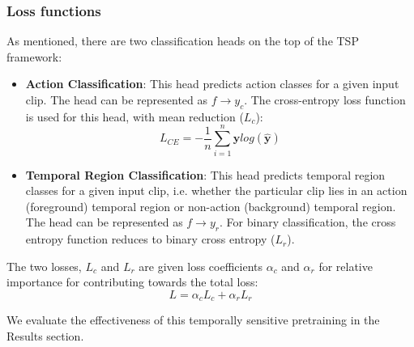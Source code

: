 \subsubsection{Loss functions} As mentioned, there are two classification heads on the top of the TSP framework:
\begin{itemize}
	\item \textbf{Action Classification}: This head predicts action classes for a given input clip. The head can be represented as $f \rightarrow y_c$. The cross-entropy loss function is used for this head, with mean reduction ($L_c$):
$$ L_{CE} = -\frac{1}{n} \sum_{i=1}^{n}{\textbf{y}log(\hat{\textbf{y}})} $$
	\item \textbf{Temporal Region Classification}: This head predicts temporal region classes for a given input clip, i.e. whether the particular clip lies in an action (foreground) temporal region or non-action (background) temporal region. The head can be represented as $f \rightarrow y_r$. For binary classification, the cross entropy function reduces to binary cross entropy ($L_r$).
\end{itemize}
\par The two losses, $L_c$ and $L_r$ are given loss coefficients $\alpha_c$ and $\alpha_r$ for relative importance for contributing towards the total loss:
$$ L = \alpha_c L_c + \alpha_r L_r $$

\par We evaluate the effectiveness of this temporally sensitive pretraining in the Results section.

